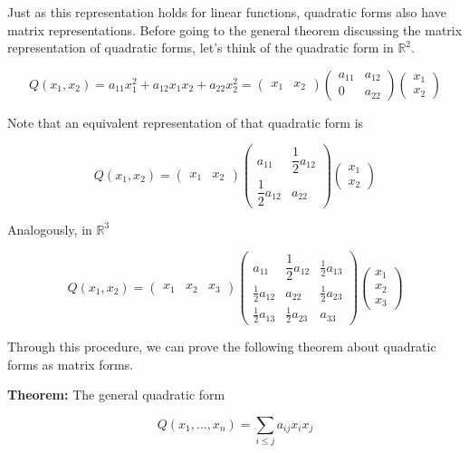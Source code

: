 \documentclass[11pt]{article}
\begin{document}
Just as this representation holds for linear functions, quadratic forms
also have matrix representations. Before going to the general theorem
discussing the matrix representation of quadratic forms, let's think of
the quadratic form in \(\mathbb{R}^2\).

\[
Q(x_1, x_2) = a_{11}x_1^2 + a_{12}x_1 x_2 + a_{22} x_2^2 = \begin{pmatrix} x_1 & x_2 \end{pmatrix} \begin{pmatrix} a_{11} & a_{12} \\ 0 & a_{22}\end{pmatrix} \begin{pmatrix} x_1 \\ x_2 \end{pmatrix}
\]

Note that an equivalent representation of that quadratic form is

\[
Q(x_1, x_2) = \begin{pmatrix} x_1 & x_2 \end{pmatrix} \begin{pmatrix} a_{11} & \dfrac{1}{2}a_{12} \\ \dfrac{1}{2}a_{12} & a_{22}\end{pmatrix} \begin{pmatrix} x_1 \\ x_2 \end{pmatrix}
\]

Analogously, in \(\mathbb{R}^3\)

\[
Q(x_1, x_2) = \begin{pmatrix} x_1 & x_2 & x_3\end{pmatrix} \begin{pmatrix} a_{11} & \dfrac{1}{2}a_{12} & \frac{1}{2} a_{13} \\ \frac{1}{2}a_{12} & a_{22} & \frac{1}{2}a_{23} \\ \frac{1}{2}a_{13} & \frac{1}{2} a_{23} & a_{33}\end{pmatrix} \begin{pmatrix} x_1 \\ x_2 \\ x_3 \end{pmatrix}
\]

Through this procedure, we can prove the following theorem about
quadratic forms as matrix forms.

\textbf{Theorem:} The general quadratic form

\[
Q(x_1, \ldots, x_n) = \sum_{i\leq j} a_{ij}x_i x_j
\]
\end{document}
